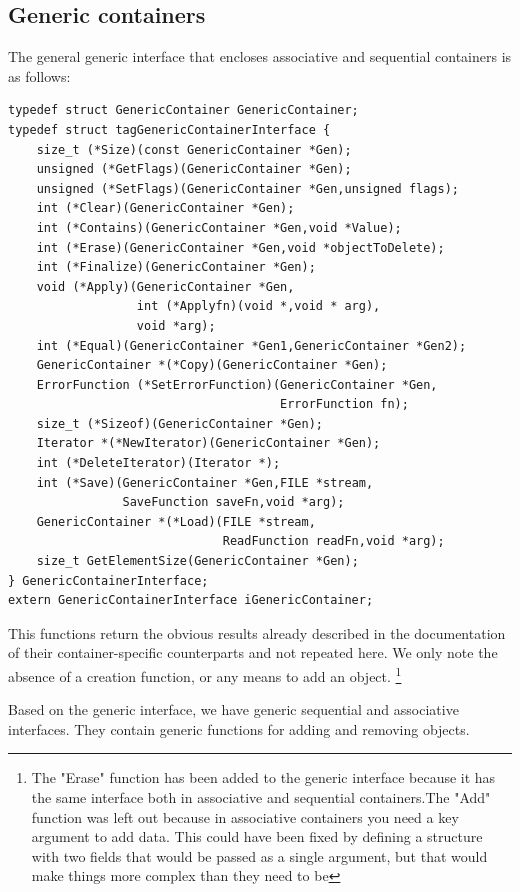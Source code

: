 \documentclass[12pt,a4paper]{memoir} %
\begin{document}
{{\subsection{Generic containers}
The general generic interface that encloses associative and sequential containers is as follows:
\begin{verbatim}
typedef struct GenericContainer GenericContainer;
typedef struct tagGenericContainerInterface {
    size_t (*Size)(const GenericContainer *Gen);
    unsigned (*GetFlags)(GenericContainer *Gen);
    unsigned (*SetFlags)(GenericContainer *Gen,unsigned flags);
    int (*Clear)(GenericContainer *Gen);
    int (*Contains)(GenericContainer *Gen,void *Value);
    int (*Erase)(GenericContainer *Gen,void *objectToDelete);
    int (*Finalize)(GenericContainer *Gen);
    void (*Apply)(GenericContainer *Gen,
                  int (*Applyfn)(void *,void * arg),
                  void *arg);
    int (*Equal)(GenericContainer *Gen1,GenericContainer *Gen2);
    GenericContainer *(*Copy)(GenericContainer *Gen);
    ErrorFunction (*SetErrorFunction)(GenericContainer *Gen,
                                      ErrorFunction fn);
    size_t (*Sizeof)(GenericContainer *Gen);
    Iterator *(*NewIterator)(GenericContainer *Gen);
    int (*DeleteIterator)(Iterator *);
    int (*Save)(GenericContainer *Gen,FILE *stream, 
                SaveFunction saveFn,void *arg);
    GenericContainer *(*Load)(FILE *stream, 
                              ReadFunction readFn,void *arg);
    size_t GetElementSize(GenericContainer *Gen);
} GenericContainerInterface;
extern GenericContainerInterface iGenericContainer;
\end{verbatim}
This functions return the obvious results already described in the documentation of their container-specific counterparts and not repeated here. We only note the absence of a creation function, or any means to add an object.
\footnote{The "Erase" function  has been added to the generic interface because it has the same interface both in associative and sequential containers.The "Add" function was left out because in associative containers you need a key argument to add data. This could have been fixed by defining a structure with two fields that would be passed as a single argument, but that would make things more complex than they need to be}

Based on the generic interface, we have generic sequential and associative interfaces. They contain generic functions for adding and removing objects.
}}
\end{document}
